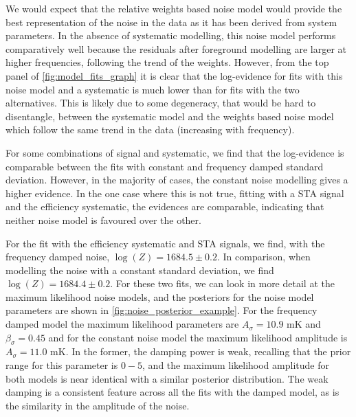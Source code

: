 We would expect that the relative weights based noise model would provide the best representation of the noise in the data as it has been derived from system parameters. In the absence of systematic modelling, this noise model performs comparatively well because the residuals after foreground modelling are larger at higher frequencies, following the trend of the weights. However, from the top panel of \cref{fig:model_fits_graph} it is clear that the log-evidence for fits with this noise model and a systematic is much lower than for fits with the two alternatives. This is likely due to some degeneracy, that would be hard to disentangle, between the systematic model and the weights based noise model which follow the same trend in the data (increasing with frequency). %

For some combinations of signal and systematic, we find that the log-evidence is comparable between the fits with constant and frequency damped standard deviation. However, in the majority of cases, the constant noise modelling gives a higher evidence. In the one case where this is not true, fitting with a STA signal and the efficiency systematic, the evidences are comparable, indicating that neither noise model is favoured over the other.

For the fit with the efficiency systematic and STA signals, we find, with the frequency damped noise, $\log(Z) = 1684.5 \pm 0.2$. In comparison, when modelling the noise with a constant standard deviation, we find $\log(Z) = 1684.4 \pm 0.2$. For these two fits, we can look in more detail at the maximum likelihood noise models, and the posteriors for the noise model parameters are shown in \cref{fig:noise_posterior_example}. For the frequency damped model the maximum likelihood parameters are $A_\sigma = 10.9$ mK and $\beta_\sigma = 0.45$ and for the constant noise model the maximum likelihood amplitude is $A_\sigma = 11.0$ mK. In the former, the damping power is weak, recalling that the prior range for this parameter is $0 - 5$, and the maximum likelihood amplitude for both models is near identical with a similar posterior distribution. The weak damping is a consistent feature across all the fits with the damped model, as is the similarity in the amplitude of the noise.

